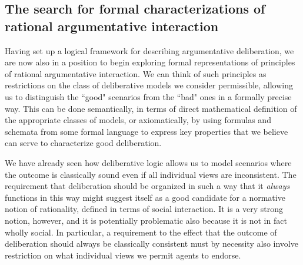 \documentclass[greybox]{svmult}
\begin{document}
\subsection{The search for formal characterizations of rational argumentative interaction}\label{sub:for}

Having set up a logical framework for describing argumentative deliberation, we are now also in a position to begin exploring formal representations of principles of rational argumentative interaction. We can think of such principles as restrictions on the class of deliberative models we consider permissible, allowing us to distinguish the ``good" scenarios from the ``bad" ones in a formally precise way. This can be done semantically, in terms of direct mathematical definition of the appropriate classes of models, or axiomatically, by using formulas and schemata from some formal language to express key properties that we believe can serve to characterize good deliberation.

We have already seen how deliberative logic allows us to model scenarios where the outcome is classically sound even if all individual views are inconsistent. The requirement that deliberation should be organized in such a way that it \emph{always} functions in this way might suggest itself as a good candidate for a normative notion of rationality, defined in terms of social interaction. It is a very strong notion, however, and it is potentially problematic also because it is not in fact wholly social. In particular, a requirement to the effect that the outcome of deliberation should always be classically consistent must by necessity also involve restriction on what individual views we permit agents to endorse. 
\end{document}
